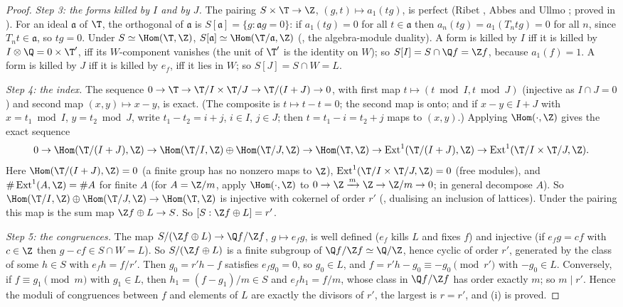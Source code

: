 \begin{proof}
\emph{Step 3: the forms killed by $I$ and by $J$.} The pairing $S\times\T\to\Z$, $(g,t)\mapsto a_1(tg)$, is perfect (Ribet \cite[Theorem 2.2]{Ribet83}, Abbes and Ullmo
\cite[Lemma 2.1]{AU96}; proved in ). For an ideal $\mathfrak a$ of $\T$, the orthogonal of $\mathfrak a$ is $S[\mathfrak a]=\{g:\mathfrak ag=0\}$: if $a_1(tg)=0$ for all $t\in\mathfrak a$ then
$a_n(tg)=a_1(T_ntg)=0$ for all $n$, since $T_nt\in\mathfrak a$, so $tg=0$. Under $S\simeq\Hom(\T,\Z)$, $S[\mathfrak a]\simeq\Hom(\T/\mathfrak a,\Z)$ (, the algebra-module duality). A form
is killed by $I$ iff it is killed by $I\otimes\Q=0\times\T'$, iff its $W$-component vanishes (the unit of $\T'$ is the identity on $W$); so $S[I]=S\cap\Q f=\Z f$, because $a_1(f)=1$.
A form is killed by $J$ iff it is killed by $e_f$, iff it lies in $W$; so $S[J]=S\cap W=L$.

\emph{Step 4: the index.} The sequence $0\to\T\to\T/I\times\T/J\to\T/(I+J)\to0$, with first map $t\mapsto(t\bmod I,t\bmod J)$ (injective as $I\cap J=0$) and second map $(x,y)\mapsto x-y$, is
exact. (The composite is $t\mapsto t-t=0$; the second map is onto; and if $x-y\in I+J$ with $x=t_1\bmod I$, $y=t_2\bmod J$, write $t_1-t_2=i+j$, $i\in I$, $j\in J$; then
$t=t_1-i=t_2+j$ maps to $(x,y)$.) Applying $\Hom(\cdot,\Z)$ gives the exact sequence
\[
0\to\Hom(\T/(I+J),\Z)\to\Hom(\T/I,\Z)\oplus\Hom(\T/J,\Z)\to\Hom(\T,\Z)\to\operatorname{Ext}^1(\T/(I+J),\Z)\to\operatorname{Ext}^1(\T/I\times\T/J,\Z).
\]
Here $\Hom(\T/(I+J),\Z)=0$ (a finite group has no nonzero maps to $\Z$), $\operatorname{Ext}^1(\T/I\times\T/J,\Z)=0$ (free modules), and $\#\operatorname{Ext}^1(A,\Z)=\#A$ for finite $A$ (for $A=\Z/m$,
apply $\Hom(\cdot,\Z)$ to $0\to\Z\xrightarrow{m}\Z\to\Z/m\to0$; in general decompose $A$). So $\Hom(\T/I,\Z)\oplus\Hom(\T/J,\Z)\to\Hom(\T,\Z)$ is injective with cokernel of order $r'$ (, dualising an inclusion of lattices). Under the
pairing this map is the sum map $\Z f\oplus L\to S$. So $[S:\Z f\oplus L]=r'$.

\emph{Step 5: the congruences.} The map $S/(\Z f\oplus L)\to\Q f/\Z f$, $g\mapsto e_fg$, is well defined ($e_f$ kills $L$ and fixes $f$) and injective (if $e_fg=cf$ with $c\in\Z$ then
$g-cf\in S\cap W=L$). So $S/(\Z f\oplus L)$ is a finite subgroup of $\Q f/\Z f\simeq\Q/\Z$, hence cyclic of order $r'$, generated by the class of some $h\in S$ with $e_fh=f/r'$. Then
$g_0=r'h-f$ satisfies $e_fg_0=0$, so $g_0\in L$, and $f=r'h-g_0\equiv-g_0\pmod{r'}$ with $-g_0\in L$. Conversely, if $f\equiv g_1\pmod m$ with $g_1\in L$, then $h_1=(f-g_1)/m\in S$
and $e_fh_1=f/m$, whose class in $\Q f/\Z f$ has order exactly $m$; so $m\mid r'$. Hence the moduli of congruences between $f$ and elements of $L$ are exactly the
divisors of $r'$, the largest is $r=r'$, and (i) is proved.


\end{proof}
